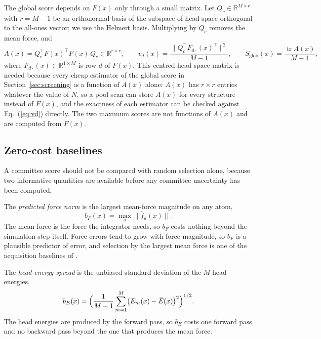 The global score depends on $F(x)$ only through a small matrix. Let
$Q_c\in\mathbb{R}^{M\times r}$ with $r=M-1$ be an orthonormal basis of the
subspace of head space orthogonal to the all-ones vector; we use the Helmert
basis. Multiplying by $Q_c$ removes the mean force, and
\begin{equation}
A(x)=Q_c^{\top}F(x)^{\top}F(x)\,Q_c\in\mathbb{R}^{r\times r},\qquad
v_d(x)=\frac{\lVert Q_c^{\top}F_{d\cdot}(x)^{\top}\rVert^{2}}{M-1},\qquad
S_{\mathrm{glob}}(x)=\frac{\operatorname{tr}A(x)}{M-1},
\label{eq:A}
\end{equation}
where $F_{d\cdot}(x)\in\mathbb{R}^{1\times M}$ is row $d$ of $F(x)$. This
centred head-space matrix is needed because every cheap estimator of the
global score in Section~\ref{sec:screening} is a function of $A(x)$ alone:
$A(x)$ has $r\times r$ entries whatever the value of $N$, so a pool scan can
store $A(x)$ for every structure instead of $F(x)$, and the exactness of each
estimator can be checked against Eq.~(\ref{eq:vd}) directly. The two maximum
scores are not functions of $A(x)$ and are computed from $F(x)$.

\subsection{Zero-cost baselines}
\label{sec:baselines}

A committee score should not be compared with random selection alone, because
two informative quantities are available before any committee uncertainty has
been computed.

The \emph{predicted force norm} is the largest mean-force magnitude on any
atom,
\begin{equation}
b_F(x)=\max_{a}\lVert \bar f_a(x)\rVert .
\label{eq:bF}
\end{equation}
The mean force is the force the integrator needs, so $b_F$ costs nothing beyond
the simulation step itself. Force errors tend to grow with force magnitude, so
$b_F$ is a plausible predictor of error, and selection by the largest mean
force is one of the acquisition baselines of \citet{beck2025committee}.

The \emph{head-energy spread} is the unbiased standard deviation of the $M$
head energies,
\begin{equation}
b_E(x)=\Bigl(\frac{1}{M-1}\sum_{m=1}^{M}\bigl(E_m(x)-\bar E(x)\bigr)^2\Bigr)^{1/2}.
\label{eq:bE}
\end{equation}
The head energies are produced by the forward pass, so $b_E$ costs one forward
pass and no backward pass beyond the one that produces the mean force.

